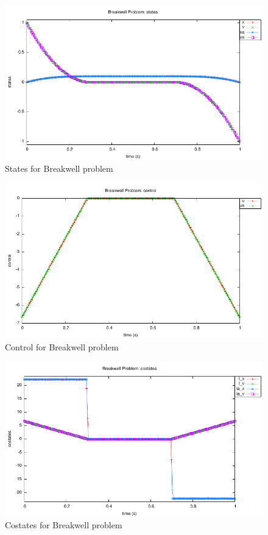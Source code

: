 \documentclass[a4paper,11pt]{report}    %
\begin{document}
\begin{figure}
  \centering
  \includegraphics{../examples/breakwell/breakwell_states}
  \caption{States for Breakwell problem}
  \label{breakwell_states}
\end{figure}


\begin{figure}
  \centering
  \includegraphics{../examples/breakwell/breakwell_control}
  \caption{Control for Breakwell problem}
  \label{breakwell_control}
\end{figure}

\begin{figure}
  \centering
  \includegraphics{../examples/breakwell/breakwell_costates}
  \caption{Costates for Breakwell problem}
  \label{breakwell_costates}
\end{figure}
\end{document}

